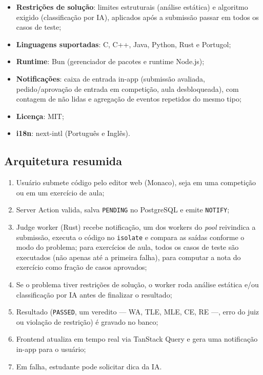 \documentclass[12pt]{article}
\begin{document}
\begin{itemize}[nosep]
  \item \textbf{Restrições de solução}: limites estruturais (análise
        estática) e algoritmo exigido (classificação por IA), aplicados após
        a submissão passar em todos os casos de teste;
  \item \textbf{Linguagens suportadas}: C, C++, Java, Python, Rust e
        Portugol;
  \item \textbf{Runtime}: Bun (gerenciador de pacotes e runtime Node.js);
  \item \textbf{Notificações}: caixa de entrada in-app (submissão avaliada,
        pedido/aprovação de entrada em competição, aula desbloqueada), com
        contagem de não lidas e agregação de eventos repetidos do mesmo
        tipo;
  \item \textbf{Licença}: MIT;
  \item \textbf{i18n}: next-intl (Português e Inglês).
\end{itemize}

\subsection*{Arquitetura resumida}

\begin{enumerate}[nosep]
  \item Usuário submete código pelo editor web (Monaco), seja em uma
        competição ou em um exercício de aula;
  \item Server Action valida, salva \texttt{PENDING} no PostgreSQL e emite
        \texttt{NOTIFY};
  \item Judge worker (Rust) recebe notificação, um dos workers do
        \emph{pool} reivindica a submissão, executa o código no
        \texttt{isolate} e compara as saídas conforme o modo do problema; para exercícios de aula, todos os
        casos de teste são executados (não apenas até a primeira falha),
        para computar a nota do exercício como fração de casos aprovados;
  \item Se o problema tiver restrições de solução, o worker roda análise
        estática e/ou classificação por IA antes de finalizar o resultado;
  \item Resultado (\texttt{PASSED}, um veredito --- WA, TLE, MLE, CE, RE ---,
        erro do juiz ou violação de restrição) é gravado no banco;
  \item Frontend atualiza em tempo real via TanStack Query e gera uma
        notificação in-app para o usuário;
  \item Em falha, estudante pode solicitar dica da IA.
\end{enumerate}
\end{document}
